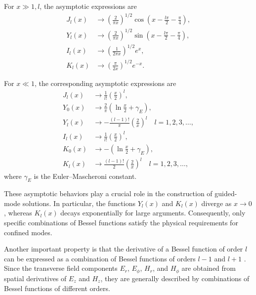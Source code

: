 For $ x \gg 1, l$, the asymptotic expressions are
\begin{equation}
    \begin{aligned}
        \label{eq:bessel_asympototic_x_large}
        J_l(x) & \to \left(\frac{2}{\pi x}\right)^{1/2} \cos\left(x - \frac{l\pi}{2} - \frac{\pi}{4}\right), \\[1mm]
        Y_l(x) & \to \left(\frac{2}{\pi x}\right)^{1/2} \sin\left(x - \frac{l\pi}{2} - \frac{\pi}{4}\right), \\[1mm]
        I_l(x) & \to \left(\frac{1}{2\pi x}\right)^{1/2} e^x,                                                \\[1mm]
        K_l(x) & \to \left(\frac{\pi}{2x}\right)^{1/2} e^{-x}.
    \end{aligned}
\end{equation}

For $x \ll 1$, the corresponding asymptotic expressions are
\begin{equation}
    \begin{aligned}
        \label{eq:bessel_asymptotic_x_small}
        J_l(x) &\rightarrow \frac{1}{l!} \left( \frac{x}{2} \right)^l, \\[1mm]
        Y_0(x) &\rightarrow \frac{2}{\pi} \left( \ln \frac{x}{2} + \gamma_E \right), \\[1mm]
        Y_l(x) &\rightarrow -\frac{(l-1)!}{\pi} \left( \frac{2}{x} \right)^l \quad l = 1, 2, 3, \ldots ,\\[1mm]
        I_l(x) &\rightarrow \frac{1}{l!} \left( \frac{x}{2} \right)^l ,\\[1mm]
        K_0(x) &\rightarrow -\left( \ln \frac{x}{2} + \gamma_E \right) ,\\[1mm]
        K_l(x) &\rightarrow \frac{(l-1)!}{2} \left( \frac{2}{x} \right)^l \quad l = 1, 2, 3, \ldots ,
    \end{aligned}
\end{equation}
where $\gamma_E$ is the Euler–Mascheroni constant.

These asymptotic behaviors play a crucial role in the construction of guided-mode solutions. In particular, the functions $Y_l(x)$ and $K_l(x)$ diverge as $x\rightarrow 0$, whereas $K_l(x)$ decays exponentially for large arguments. Consequently, only specific combinations of Bessel functions satisfy the physical requirements for confined modes.

Another important property is that the derivative of a Bessel function of order $l$ can be expressed as a combination of Bessel functions of orders $l-1$ and $l+1$ \cite{abramowitz1965handbook}. Since the transverse field components $E_r$, $E_\phi$, $H_r$, and $H_\phi$ are obtained from spatial derivatives of $E_z$ and $H_z$, they are generally described by combinations of Bessel functions of different orders.

